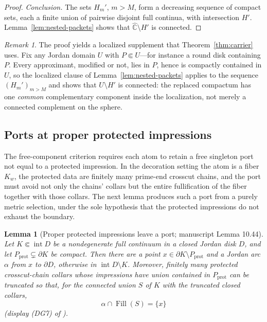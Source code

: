 \documentclass[11pt,reqno]{amsart}
\newtheorem{lemma}[theorem]{Lemma}
\theoremstyle{definition}
\theoremstyle{remark}
\newtheorem{remark}[theorem]{Remark}
\newcommand{\Chat}{\widehat{\mathbb C}}
\newcommand{\Fill}{\operatorname{Fill}}
\newcommand{\Int}{\operatorname{int}}
\begin{document}
\begin{proof}
\emph{Conclusion.}
The sets $H_m'$, $m>M$, form a decreasing sequence of compact sets, each
a finite union of pairwise disjoint full continua, with intersection
$H'$.  Lemma~\ref{lem:nested-packets} shows that $\Chat\setminus H'$ is
connected.
\end{proof}

\begin{remark}\label{rem:F-localized}
The proof yields a localized supplement that Theorem~\ref{thm:carrier}
uses.  Fix any Jordan domain $U$ with $P\Subset U$---for instance a
round disk containing $P$.  Every approximant, modified or not, lies in
$P$, hence is compactly contained in $U$, so the localized clause of
Lemma~\ref{lem:nested-packets} applies to the sequence $(H_m')_{m>M}$
and shows that $U\setminus H'$ is connected: the replaced compactum has
one \emph{common} complementary component inside the localization, not
merely a connected complement on the sphere.
\end{remark}

\subsection{Ports at proper protected impressions}\label{subsec:F-port}

The free-component criterion requires each atom to retain a free
singleton port not equal to a protected impression.  In the decoration
setting the atom is a fiber $K_w$, the protected data are finitely many
prime-end crosscut chains, and the port must avoid not only the chains'
collars but the entire fullification of the fiber together with those
collars.  The next lemma produces such a port from a purely metric
selection, under the sole hypothesis that the protected impressions do
not exhaust the boundary.

\begin{lemma}[Proper protected impressions leave a port; manuscript
Lemma 10.44]\label{lem:impression-port}
Let $K\Subset\Int D$ be a nondegenerate full continuum in a closed
Jordan disk $D$, and let $P_{\mathrm{prot}}\subsetneq\partial K$ be
compact.  Then there are a point
$x\in\partial K\setminus P_{\mathrm{prot}}$ and a Jordan arc $\alpha$
from $x$ to $\partial D$, otherwise in $\Int D\setminus K$.  Moreover,
finitely many protected crosscut-chain collars whose impressions have
union contained in $P_{\mathrm{prot}}$ can be truncated so that, for the
connected union $S$ of $K$ with the truncated closed collars,
\begin{equation}\label{eq:F-port}
\alpha\cap\Fill(S)=\{x\}
\end{equation}
(display (DG7) of \cite{MWman}).
\end{lemma}
\end{document}
